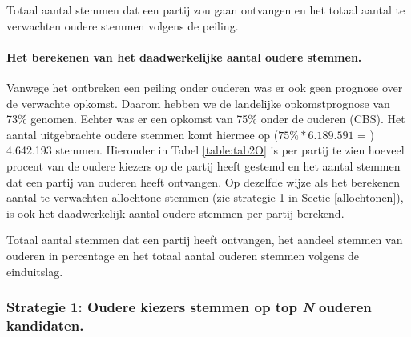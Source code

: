 \begin{table}[H]
\centering
	\begin{footnotesize}
		
	\end{footnotesize}
			\caption{Totaal aantal stemmen dat een partij zou gaan ontvangen en het totaal aantal te verwachten oudere stemmen volgens de peiling.}
\label{table:tab1O} 
\end{table}


\paragraph{Het berekenen van het daadwerkelijke aantal oudere stemmen.}

Vanwege het ontbreken een peiling onder ouderen was er ook geen prognose over de verwachte opkomst. Daarom hebben we de landelijke opkomstprognose van 73\% genomen. Echter was er een opkomst van 75\% onder de ouderen (CBS). Het aantal uitgebrachte oudere stemmen komt hiermee op ($75\%*6.189.591$ = ) 4.642.193 stemmen. Hieronder in Tabel \ref{table:tab2O} is per partij te zien hoeveel procent van de oudere kiezers op de partij heeft gestemd en het aantal stemmen dat een partij van ouderen heeft ontvangen. Op dezelfde wijze als het berekenen aantal te verwachten allochtone stemmen (zie \hyperref[S1A]{strategie 1} in Sectie \ref{allochtonen}), is ook het daadwerkelijk aantal oudere stemmen per partij berekend. 
    
\begin{table}[h]
\centering
	\begin{footnotesize}
		
	\end{footnotesize}
			\caption{Totaal aantal stemmen dat een partij heeft ontvangen, het aandeel stemmen van ouderen in percentage en het totaal aantal ouderen stemmen volgens de einduitslag.}
\label{table:tab2O} 
\end{table}
    

\subsubsection{Strategie 1: Oudere kiezers stemmen op top \textit{N} ouderen kandidaten.} 

